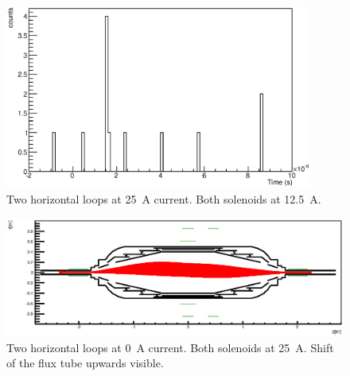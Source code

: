 \begin{figure}
\centering
	\includegraphics[width = 0.9\textwidth]{graphics/analysis/monSpec/NC.eps}
	\caption[\SI{25}{\ampere} loops]{Two horizontal loops at \SI{25}{\ampere} current. Both solenoids at \SI{12.5}{\ampere}.}
	\label{fig:NC}
\end{figure}
\clearpage








\begin{figure}
\centering
	\centerline{\includegraphics[width = 1.3\linewidth]{graphics/analysis/monSpec/fieldSimulation/ND.eps} }
	
	\caption[\SI{50}{\ampere} loops]{Two horizontal loops at \SI{0}{\ampere} current. Both solenoids at \SI{25}{\ampere}. Shift of the flux tube upwards visible. }
	\label{fig:NDf}
\end{figure}

